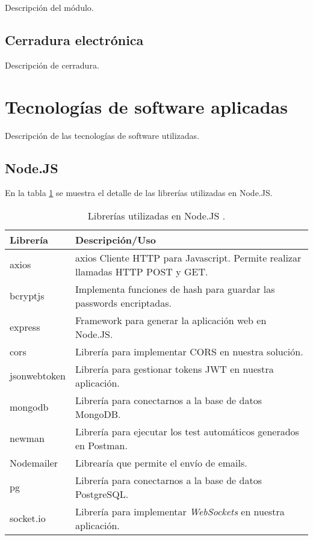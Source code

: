 Descripción del módulo.

\subsection{Cerradura electrónica}

Descripción de cerradura.

\section{Tecnologías de software aplicadas}
 
Descripción de las tecnologías de software utilizadas.

\subsection{Node.JS}


En la tabla \ref{tab:nodelibrerias} se muestra el detalle de las librerías utilizadas en Node.JS.

\begin{table}[h]
	\centering
	\caption[Leds módulo sensor ]{Librerías utilizadas en Node.JS .}
	\begin{tabular}{p{4cm} p{8.5cm} } 	

		\toprule
		\textbf{Librería} & 
		\textbf{Descripción/Uso}
		\\
		\midrule
axios & axios
Cliente HTTP para Javascript. Permite realizar llamadas HTTP POST y GET.\\
bcryptjs & Implementa funciones de hash para guardar las passwords encriptadas.\\
express & Framework para generar la aplicación web en Node.JS.\\
cors & Librería para implementar CORS en nuestra solución.\\
jsonwebtoken & Librería para gestionar tokens JWT en nuestra aplicación.\\
mongodb & Librería para conectarnos a la base de datos MongoDB.\\
newman & Librería para ejecutar los test automáticos generados en Postman. \\
Nodemailer & Librearía que permite el envío de emails.\\
pg & Librería para conectarnos a la base de datos PostgreSQL.\\
socket.io & Librería para implementar \textit{WebSockets} en nuestra aplicación.
\\
		\bottomrule
		\hline
	\end{tabular}
	\label{tab:nodelibrerias}
\end{table}




